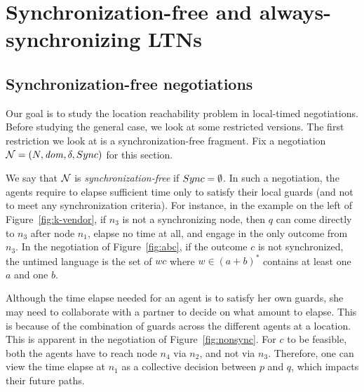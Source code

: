 
\chapter{Synchronization-free and always-synchronizing LTNs}

\section{Synchronization-free negotiations}
\label{sec:synchr-free-negot}

Our goal is to study the location reachability problem in local-timed
negotiations. Before studying the general case, we look at some
restricted versions. The first restriction we look at is a
synchronization-free fragment. Fix a negotiation
$\mathcal{N} = (N, \mathit{dom}, \delta, Sync)$ for this section.

We say that $\mathcal{N}$ is \emph{synchronization-free} if
$Sync = \emptyset$. In such a negotiation, the agents require to
elapse sufficient time only to satisfy their local guards (and not to
meet any synchronization criteria). For instance, in the example on
the left of Figure~\ref{fig:k-vendor}, if $n_3$ is not a synchronizing
node, then $q$ can come directly to $n_3$ after node $n_1$, elapse no
time at all, and engage in the only outcome from $n_3$. In the
negotiation of Figure~\ref{fig:abc}, if the outcome $c$ is not
synchronized, the untimed language is the set of $wc$ where
$w \in (a + b)^*$ contains at least one $a$ and one $b$.

Although the time elapse needed for an agent is to satisfy her own
guards, she may need to collaborate with a partner to decide on what
amount to elapse. This is because of the combination of guards across
the different agents at a location. This is apparent in the
negotiation of Figure~\ref{fig:nonsync}. For $c$ to be feasible, both
the agents have to reach node $n_4$ via $n_2$, and not via
$n_3$. Therefore, one can view the time elapse at $n_1$ as a
collective decision between $p$ and $q$, which impacts their future
paths.

